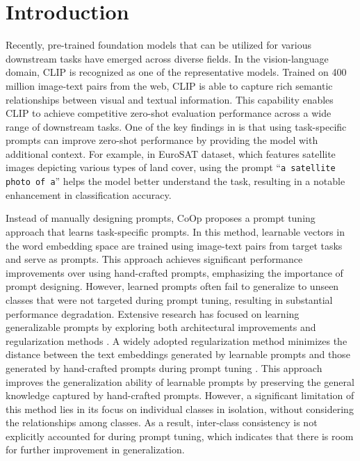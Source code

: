 \section{Introduction}
\label{sec:intro}

Recently, pre-trained foundation models that can be utilized for various downstream tasks have emerged across diverse fields. In the vision-language domain, CLIP \cite{radford2021clip} is recognized as one of the representative models. Trained on 400 million image-text pairs from the web, CLIP is able to capture rich semantic relationships between visual and textual information. This capability enables CLIP to achieve competitive zero-shot evaluation performance across a wide range of downstream tasks. One of the key findings in \cite{radford2021clip} is that using task-specific prompts can improve zero-shot performance by providing the model with additional context. For example, in EuroSAT dataset, which features satellite images depicting various types of land cover, using the prompt ``\texttt{a satellite photo of a}'' helps the model better understand the task, resulting in a notable enhancement in classification accuracy.

Instead of manually designing prompts, CoOp \cite{zhou2022learning} proposes a prompt tuning approach that learns task-specific prompts. In this method, learnable vectors in the word embedding space are trained using image-text pairs from target tasks and serve as prompts. This approach achieves significant performance improvements over using hand-crafted prompts, emphasizing the importance of prompt designing. However, learned prompts often fail to generalize to unseen classes that were not targeted during prompt tuning, resulting in substantial performance degradation. Extensive research has focused on learning generalizable prompts by exploring both architectural improvements \cite{zhou2022conditional, khattak2023maple, lee2023read, zhang2024dept} and regularization methods \cite{zhu2023prompt, yao2023kgcoop, cho2023distribution, ding2024lobg}. A widely adopted regularization method minimizes the distance between the text embeddings generated by learnable prompts and those generated by hand-crafted prompts during prompt tuning \cite{yao2023kgcoop, khattak2023promptsrc, roy2024coprompt, yao2024tcp, ding2024lobg}. This approach improves the generalization ability of learnable prompts by preserving the general knowledge captured by hand-crafted prompts. However, a significant limitation of this method lies in its focus on individual classes in isolation, without considering the relationships among classes. As a result, inter-class consistency is not explicitly accounted for during prompt tuning, which indicates that there is room for further improvement in generalization.

